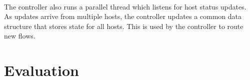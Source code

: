 \documentclass[10pt]{article}
\begin{document}
\paragraph{} The controller also runs a parallel thread which listens for host status updates. As updates arrive from multiple hosts, the controller updates a common data structure that stores state for all hosts. This is used by the controller to route new flows.

\section{Evaluation}
\label{sec:evaluation}

\paragraph{} 
\end{document}
